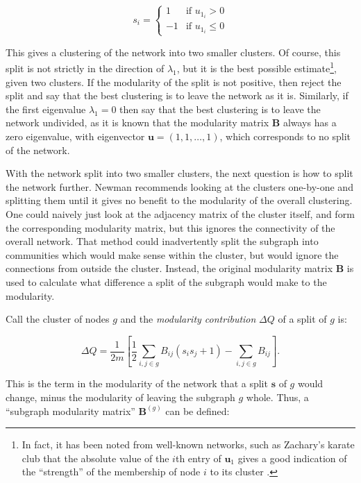\begin{equation}
s_i =\left\{ \begin{array}{ll} 1 & \mbox{if } u_{1_i}>0 \\
-1 & \mbox{if } u_{1_i}\leq0 \end{array} \right.
\end{equation}

This gives a clustering of the network into two smaller clusters. Of course, 
this split is not strictly in the direction of $\lambda_1$, but it is the best 
possible estimate\footnote{In fact, it has been noted from well-known networks, 
such as Zachary's karate club \cite{Zachary1977a} that the absolute value of 
the $i$th entry of $\mathbf{u}_1$ gives a good indication of the ``strength'' 
of the membership of node $i$ to its cluster \cite{Newman2006a}.}, given two 
clusters. If the modularity of the split is not positive, then reject the 
split and say that the best clustering is to leave the network as it is.  
Similarly, if the first eigenvalue $\lambda_1 = 0$ then say that the best 
clustering is to leave the network undivided, as it is known that the modularity 
matrix $\mathbf{B}$ always has a zero eigenvalue, with eigenvector 
$\mathbf{u} = ( 1,1, \ldots, 1)$, which corresponds to no split of the network.

With the network split into two smaller clusters, the next
question is how to split the network further.  Newman \cite{Newman2006a} recommends looking at the clusters
one-by-one and splitting them until it gives no benefit to the modularity
of the overall clustering.  One could naively just look at the
adjacency matrix of the cluster itself, and form the 
corresponding modularity matrix, but this ignores the connectivity of the
overall network.  That method could inadvertently split the subgraph into communities 
which would make sense within the cluster, but would ignore the connections 
from outside the cluster. Instead, the original modularity 
matrix $\mathbf{B}$ is used to calculate what difference a split of the subgraph would 
make to the modularity.

Call the cluster of nodes $g$ and the \emph{modularity contribution} $\Delta Q$ of a 
split of $g$ is:

\begin{equation}
\Delta Q  =  \frac{1}{2m} \left[ \frac{1}{2}\sum_{i,j\in g}B_{ij}(s_is_j + 1) - \sum_{i,j \in g} B_{ij} \right].
\end{equation}

This is the term in the modularity of the network that a split $\mathbf{s}$ of 
$g$ would change, minus the modularity of leaving the subgraph $g$ whole.  Thus, a ``subgraph modularity matrix'' $\mathbf{B}^{(g)}$ can be defined:

